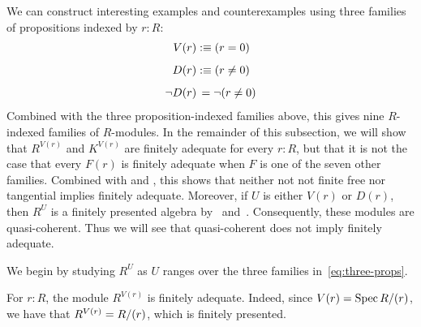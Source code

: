 \smallskip

We can construct interesting examples and counterexamples using three families of propositions
indexed by $r : R$:
\begin{equation}\label{eq:three-props}
\begin{aligned}
       V(r) &:\equiv      (r =    0) \\[5pt]
       D(r) &:\equiv      (r \neq 0) \\[5pt]
  \lnot D(r) &\,=      \lnot (r \neq 0)
\end{aligned}
\end{equation}
Combined with the three proposition-indexed families above, this gives nine
$R$-indexed families of $R$-modules.
In the remainder of this subsection, we will show that $R^{V(r)}$ and $K^{V(r)}$ are
finitely adequate for every $r : R$, but that it is not the case that
every $F(r)$ is finitely adequate when $F$ is one of the seven other families.
Combined with  and ,
this shows that neither not not finite free nor tangential implies finitely adequate.
Moreover, if $U$ is either $V(r)$ or $D(r)$, then $R^U$ is a finitely presented algebra
by~\cite[Definition 4.1.1]{draft} and~\cite[Proposition 3.1.6]{draft}.
Consequently, these modules are quasi-coherent.
Thus we will see that quasi-coherent does not imply finitely adequate.

\smallskip

We begin by studying $R^U$ as $U$ ranges over the three families in~\eqref{eq:three-props}.

\begin{example}\label{ex:exp-Vr-fin-adeq}
  For $r : R$, the module $R^{V(r)}$ is finitely adequate.
  Indeed, since $V(r) = \operatorname{Spec} R/(r)$, we have that
  $R^{V(r)} = R/(r)$, which is finitely presented.
\end{example}

